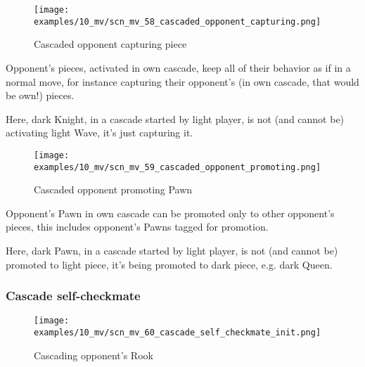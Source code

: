 
\clearpage %

\vspace*{-2.1\baselineskip}
\noindent
\begin{figure}[h]
\texttt{[image: examples/10\_mv/scn\_mv\_58\_cascaded\_opponent\_capturing.png]}
\caption{Cascaded opponent capturing piece}
\label{fig:scn_mv_58_cascaded_opponent_capturing}
\end{figure}

Opponent's pieces, activated in own cascade, keep all of their behavior as if in a
normal move, for instance capturing their opponent's (in own cascade, that would be
own!) pieces.

Here, dark Knight, in a cascade started by light player, is not (and cannot be)
activating light Wave, it's just capturing it.

\clearpage %

\vspace*{-2.1\baselineskip}
\noindent
\begin{figure}[h]
\texttt{[image: examples/10\_mv/scn\_mv\_59\_cascaded\_opponent\_promoting.png]}
\caption{Cascaded opponent promoting Pawn}
\label{fig:scn_mv_59_cascaded_opponent_promoting}
\end{figure}

Opponent's Pawn in own cascade can be promoted only to other opponent's pieces,
this includes opponent's Pawns tagged for promotion.

Here, dark Pawn, in a cascade started by light player, is not (and cannot be)
promoted to light piece, it's being promoted to dark piece, e.g. dark Queen.

\clearpage %

\subsubsection*{Cascade self-checkmate}
\label{sec:Miranda's veil/Wave/Cascading opponent/Cascade self-checkmate}

\vspace*{-1.5\baselineskip}
\noindent
\begin{figure}[h]
\texttt{[image: examples/10\_mv/scn\_mv\_60\_cascade\_self\_checkmate\_init.png]}
\vspace*{-1.4\baselineskip}
\caption{Cascading opponent's Rook}
\label{fig:scn_mv_60_cascade_self_checkmate_init}
\end{figure}

